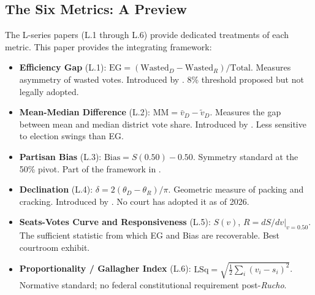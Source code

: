 \subsection{The Six Metrics: A Preview}

The L-series papers (L.1 through L.6) provide dedicated treatments of each metric.
This paper provides the integrating framework:

\begin{itemize}
\item \textbf{Efficiency Gap} (L.1): $\text{EG} = (\text{Wasted}_D - \text{Wasted}_R)/\text{Total}$.
  Measures asymmetry of wasted votes. Introduced by \citet{stephanopoulosMcGhee2015}.
  8\% threshold proposed but not legally adopted.
\item \textbf{Mean-Median Difference} (L.2): $\text{MM} = \bar{v}_D - \tilde{v}_D$.
  Measures the gap between mean and median district vote share.
  Introduced by \citet{wang2016}. Less sensitive to election swings than EG.
\item \textbf{Partisan Bias} (L.3): $\text{Bias} = S(0.50) - 0.50$.
  Symmetry standard at the 50\% pivot. Part of the framework in
  \citet{grofmanKing2007}.
\item \textbf{Declination} (L.4): $\delta = 2(\theta_D - \theta_R)/\pi$.
  Geometric measure of packing and cracking. Introduced by \citet{warrington2018}.
  No court has adopted it as of 2026.
\item \textbf{Seats-Votes Curve and Responsiveness} (L.5): $S(v)$, $R = dS/dv|_{v=0.50}$.
  The sufficient statistic from which EG and Bias are recoverable. Best courtroom exhibit.
\item \textbf{Proportionality / Gallagher Index} (L.6):
  $\text{LSq} = \sqrt{\tfrac{1}{2}\sum_i(v_i-s_i)^2}$.
  Normative standard; no federal constitutional requirement post-\textit{Rucho}.
\end{itemize}
